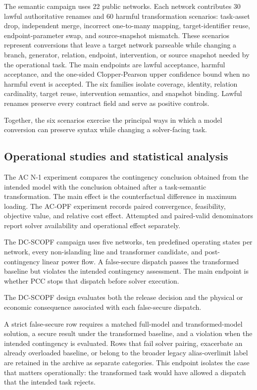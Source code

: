 \documentclass[preprint,12pt]{elsarticle}
\begin{document}
The semantic campaign uses 22 public networks. Each network contributes 30 lawful authoritative renames and 60 harmful transformation scenarios: task-asset drop, independent merge, incorrect one-to-many mapping, target-identifier reuse, endpoint-parameter swap, and source-snapshot mismatch. These scenarios represent conversions that leave a target network parseable while changing a branch, generator, relation, endpoint, intervention, or source snapshot needed by the operational task. The main endpoints are lawful acceptance, harmful acceptance, and the one-sided Clopper-Pearson upper confidence bound when no harmful event is accepted. The six families isolate coverage, identity, relation cardinality, target reuse, intervention semantics, and snapshot binding. Lawful renames preserve every contract field and serve as positive controls.

Together, the six scenarios exercise the principal ways in which a model conversion can preserve syntax while changing a solver-facing task.

\subsection{Operational studies and statistical analysis}

The AC N-1 experiment compares the contingency conclusion obtained from the intended model with the conclusion obtained after a task-semantic transformation. The main effect is the counterfactual difference in maximum loading. The AC-OPF experiment records paired convergence, feasibility, objective value, and relative cost effect. Attempted and paired-valid denominators report solver availability and operational effect separately.

The DC-SCOPF campaign uses five networks, ten predefined operating states per network, every non-islanding line and transformer candidate, and post-contingency linear power flow. A false-secure dispatch passes the transformed baseline but violates the intended contingency assessment. The main endpoint is whether PCC stops that dispatch before solver execution.

The DC-SCOPF design evaluates both the release decision and the physical or economic consequence associated with each false-secure dispatch.

A strict false-secure row requires a matched full-model and transformed-model solution, a secure result under the transformed baseline, and a violation when the intended contingency is evaluated. Rows that fail solver pairing, exacerbate an already overloaded baseline, or belong to the broader legacy alias-overlimit label are retained in the archive as separate categories. This endpoint isolates the case that matters operationally: the transformed task would have allowed a dispatch that the intended task rejects.
\end{document}
